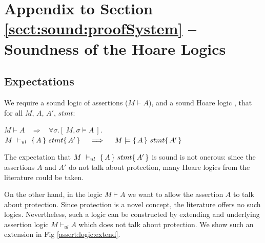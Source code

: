 \section{Appendix to Section \ref{sect:sound:proofSystem} -- Soundness of the Hoare Logics}

\subsection{Expectations}
\label{s:expectations}

\begin{axiom}
\label{lemma:axiom:enc:assert:ul}
\label{ax:ul:sound}
We require a sound logic of assertions ($M \vdash A$), and a sound Hoare logic , \ie that for all $M$, $A$, $A'$, $stmt$:
\begin{center}
$M \vdash A   \ \ \ \  \Longrightarrow  \ \ \ \  \forall \sigma.[\ M, \sigma \models A\ ]$.\\
%
%
{$M\ \vdash_{ul}\   \{\, A \, \}\ stmt \{\, A' \, \}  \ \ \ \  \Longrightarrow  \ \ \ \ M \models   \{\, A \, \}\ stmt \{\, A' \, \}$ }
 \end{center}
\end{axiom}

The expectation that $M\ \vdash_{ul}\  \triple A {stmt} {A'} $ is sound is not onerous: 
since the assertions $A$ and $A'$ do not talk about protection, many Hoare logics from the literature could be taken.

On the other hand, in the logic  $M \vdash A$ we want to allow the assertion $A$   to talk about protection. 
Since protection is a novel concept, the   literature offers no such logics.
Nevertheless, such a logic can be constructed by extending and underlying assertion logic $M \vdash_{ul} A$  which does not talk about protection.
We show such an extension in Fig \ref{assert:logic:extend}.


